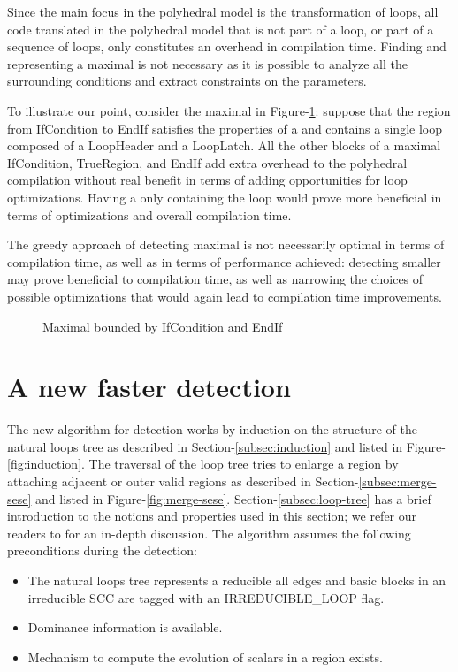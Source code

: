 \documentclass{sig-alternate}
\begin{document}
Since the main focus in the polyhedral model is the transformation of loops, all
code translated in the polyhedral model that is not part of a loop, or part of a
sequence of loops, only constitutes an overhead in compilation time.  Finding and
representing a maximal \SCoP{} is not necessary as it is possible to analyze all
the surrounding conditions and extract constraints on the parameters.

To illustrate our point, consider the maximal \SCoP{} in
Figure-\ref{fig:maximality}: suppose that the region from IfCondition to EndIf
satisfies the properties of a \SCoP{,} and contains a single loop composed of a
LoopHeader and a LoopLatch.  All the other blocks of a maximal \SCoP{}
IfCondition, TrueRegion, and EndIf add extra overhead to the polyhedral
compilation without real benefit in terms of adding opportunities for loop
optimizations.  Having a \SCoP{} only containing the loop would prove more
beneficial in terms of optimizations and overall compilation time.

The greedy approach of detecting maximal  is not necessarily optimal in
terms of compilation time, as well as in terms of performance achieved:
detecting smaller  may prove beneficial to compilation time, as well as
narrowing the choices of possible optimizations that would again lead to
compilation time improvements.

\begin{figure}
\centering
\caption{Maximal \SCoP{} bounded by IfCondition and EndIf}
\label{fig:maximality}
\end{figure}

\section{A new faster \SCoP{} detection}
\label{sec:new-SCoP-detection}
The new algorithm for \SCoP{} detection works by induction on the structure of the
natural loops tree as described in Section-\ref{subsec:induction} and listed in
Figure-\ref{fig:induction}.  The traversal of the loop tree tries to enlarge a
region by attaching adjacent or outer valid regions as described in
Section-\ref{subsec:merge-sese} and listed in Figure-\ref{fig:merge-sese}.
Section-\ref{subsec:loop-tree} has a brief introduction to the notions and
properties used in this section; we refer our readers to \cite{ramalingam} for
an in-depth discussion.  The algorithm assumes the following preconditions
during the \SCoP{} detection:
\begin{itemize}
\item The natural loops tree represents a reducible \CFG{:} all edges and basic
  blocks in an irreducible SCC are tagged with an IRREDUCIBLE\_LOOP flag.
\item Dominance information is available.
\item Mechanism to compute the evolution of scalars in a region exists.
\end{itemize}
\end{document}
